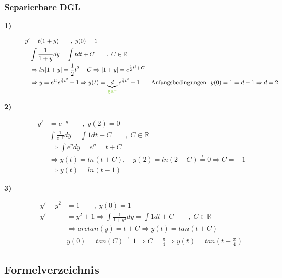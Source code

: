 \documentclass[12pt,a4paper]{article}%
\numberwithin{equation}{section}
\newcommand{\R}{\mathbb{R}} %
\def\colGreen#1{\begingroup\color{LimeGreen}{#1}\endgroup}
\def\ubGreen#1#2{\underbrace{#2}_{\colGreen{#1}}}
\def\inR#1{\qquad ,\; #1 \in \R}
\numberwithin{equation}{subsection}
\begin{document}
	  \subsubsection{Separierbare DGL}
	  \begin{description}
		    \item[\textbf{1)}]
		    \begin{align*}
		      y' &= t(1+y) \qquad,\;y(0) = 1\\
		      &\int \frac{1}{1+y} dy = \int t dt + C \inR{C}\\
		      &\Rightarrow ln |1+y| = \frac{1}{2}t^2 + C \Rightarrow |1+y| = e^{\frac{1}{2}t^2+C} \\
		      &\Rightarrow y = e^C e^{\frac{1}{2}t^2} -1 \Rightarrow y(t) = \ubGreen{\in \R^+}{d}e^{\frac{1}{2}t^2} -1
		      &\text{Anfangsbedingungen: } y(0) = 1 = d-1 \Rightarrow d = 2
		    \end{align*}
		    \item[\textbf{2)}]
		    \begin{align*}
			    y' &= e^{-y} \qquad ,\;y(2) = 0\\
			    &\int \frac{1}{e^{-y}} dy = \int 1dt + C \inR{C}\\
			    &\Rightarrow \int e^y dy = e^y = t+C\\
			    &\Rightarrow y(t) = ln(t+C), \quad y(2) = ln(2+C) \overset{!}{=} 0 \Rightarrow C = -1\\
			    &\Rightarrow y(t) = ln(t-1)
		    \end{align*}
		    \item[\textbf{3)}]
		    \begin{align*}
		      y' - y^2 &= 1 \qquad ,\;y(0) = 1\\
		      y' &= y^2 + 1 \Rightarrow \int \frac{1}{1+y^2}dy = \int 1dt +C \inR{C}\\
		      &\Rightarrow arctan(y) = t + C \Rightarrow y(t) = tan(t+C)\\
		      &y(0) = tan(C) \overset{!}{=} 1 \Rightarrow C = \frac{\pi}{4} \Rightarrow y(t) = tan(t+\frac{\pi}{4}) 
		    \end{align*}
		\end{description}
		
\newpage
\subsection{Formelverzeichnis}
\end{document}
